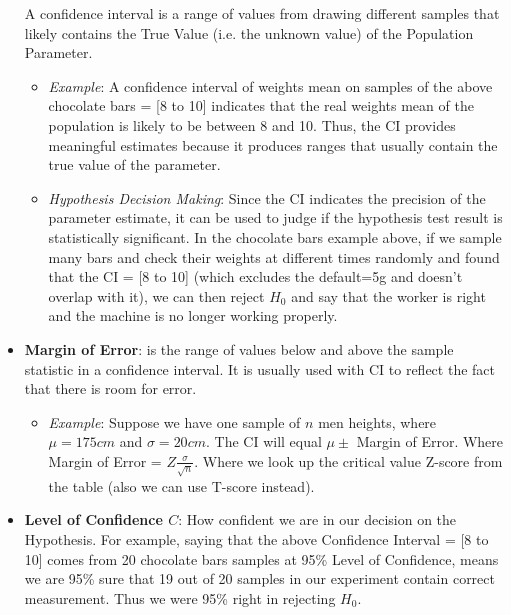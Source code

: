 \documentclass[11pt, twocolumn]{article}
\begin{document}
\begin{itemize}
A confidence interval is a {\color{blue} range of values} from drawing {\color{blue} different samples} that likely contains the {\color{blue}True Value} (i.e. the unknown value) of the {\color{blue} Population Parameter}.
\begin{itemize}
\item \textit{Example}:
A confidence interval of weights mean on samples of the above chocolate bars = [8 to 10] indicates that the real weights mean of the population is likely to be between 8 and 10. Thus, the CI provides {\color{blue}meaningful estimates} because it produces ranges that usually contain the {\color{blue} true value} of the parameter.
\item \textit{Hypothesis Decision Making}:
Since the CI indicates the precision of the parameter estimate, it can be used to judge if the hypothesis test result is statistically significant. In the chocolate bars example above, if we sample many bars and check their weights at different times randomly and found that the CI = [8 to 10] (which excludes the default=5g and doesn't overlap with it), we can then reject $H_0$ and say that the worker is right and the machine is no longer working properly.


\end{itemize}


\item \textbf{Margin of Error}: is the range of values below and above the sample statistic in a confidence interval. It is usually used with CI to reflect the fact that there is room for error.

\begin{itemize}
\item \textit{Example}:
Suppose we have  {\color{red}one} sample of $n$ men heights, where $\mu = 175 cm$ and $\sigma = 20 cm$.
The CI will equal $\mu \pm$ {\color{red}Margin of Error}. Where Margin of Error = $ Z \frac{\sigma}{\sqrt{n}}$. Where we look up the critical value Z-score from the table (also we can use T-score instead).
\end{itemize}

\item \textbf{Level of Confidence $C$}: How {\color{blue} confident} we are in our {\color{blue}decision} on the Hypothesis.
For example, saying that the above Confidence Interval = [8 to 10] comes from 20 chocolate bars samples at 95\% {\color{blue}Level of Confidence}, means we are 95\% sure that 19 out of 20 samples in our experiment contain correct measurement. Thus we were 95\% {\color{blue}right} in {\color{blue}rejecting $H_0$}.


\end{itemize}
\end{document}
